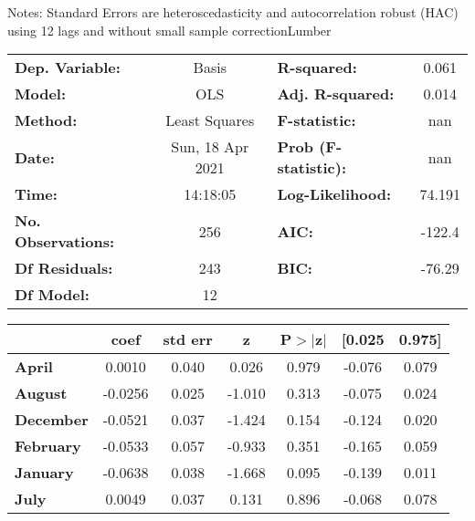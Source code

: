 Notes: \newline
 [1] Standard Errors are heteroscedasticity and autocorrelation robust (HAC) using 12 lags and without small sample correctionLumber\begin{center}
\begin{tabular}{lclc}
\toprule
\textbf{Dep. Variable:}    &      Basis       & \textbf{  R-squared:         } &     0.061   \\
\textbf{Model:}            &       OLS        & \textbf{  Adj. R-squared:    } &     0.014   \\
\textbf{Method:}           &  Least Squares   & \textbf{  F-statistic:       } &       nan   \\
\textbf{Date:}             & Sun, 18 Apr 2021 & \textbf{  Prob (F-statistic):} &      nan    \\
\textbf{Time:}             &     14:18:05     & \textbf{  Log-Likelihood:    } &    74.191   \\
\textbf{No. Observations:} &         256      & \textbf{  AIC:               } &    -122.4   \\
\textbf{Df Residuals:}     &         243      & \textbf{  BIC:               } &    -76.29   \\
\textbf{Df Model:}         &          12      & \textbf{                     } &             \\
\bottomrule
\end{tabular}
\begin{tabular}{lcccccc}
                   & \textbf{coef} & \textbf{std err} & \textbf{z} & \textbf{P$> |$z$|$} & \textbf{[0.025} & \textbf{0.975]}  \\
\midrule
\textbf{April}     &       0.0010  &        0.040     &     0.026  &         0.979        &       -0.076    &        0.079     \\
\textbf{August}    &      -0.0256  &        0.025     &    -1.010  &         0.313        &       -0.075    &        0.024     \\
\textbf{December}  &      -0.0521  &        0.037     &    -1.424  &         0.154        &       -0.124    &        0.020     \\
\textbf{February}  &      -0.0533  &        0.057     &    -0.933  &         0.351        &       -0.165    &        0.059     \\
\textbf{January}   &      -0.0638  &        0.038     &    -1.668  &         0.095        &       -0.139    &        0.011     \\
\textbf{July}      &       0.0049  &        0.037     &     0.131  &         0.896        &       -0.068    &        0.078     \\

\end{tabular}
\end{center}
